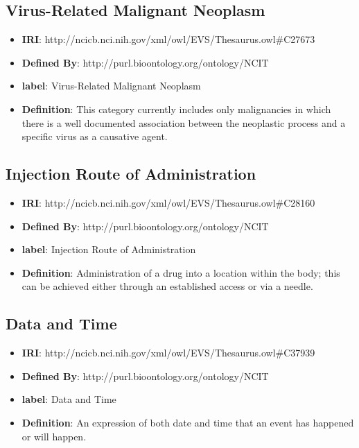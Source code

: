 \documentclass[a4paper,12pt,oneside]{article}
\begin{document}
  
  \subsection{Virus-Related Malignant Neoplasm}

  \begin{itemize}
     \item \textbf{IRI}: http://ncicb.nci.nih.gov/xml/owl/EVS/Thesaurus.owl\#C27673
     \item \textbf{Defined By}: http://purl.bioontology.org/ontology/NCIT
     \item \textbf{label}: Virus-Related Malignant Neoplasm
     \item \textbf{Definition}: This category currently includes only malignancies in which there is a well documented association between the neoplastic process and a specific virus as a causative agent.
  \end{itemize}


  \subsection{Injection Route of Administration}

  \begin{itemize}
     \item \textbf{IRI}: http://ncicb.nci.nih.gov/xml/owl/EVS/Thesaurus.owl\#C28160
     \item \textbf{Defined By}: http://purl.bioontology.org/ontology/NCIT
     \item \textbf{label}: Injection Route of Administration
     \item \textbf{Definition}: Administration of a drug into a location within the body; this can be achieved either through an established access or via a needle.
  \end{itemize}


  \subsection{Data and Time}

  \begin{itemize}
     \item \textbf{IRI}: http://ncicb.nci.nih.gov/xml/owl/EVS/Thesaurus.owl\#C37939
     \item \textbf{Defined By}: http://purl.bioontology.org/ontology/NCIT
     \item \textbf{label}: Data and Time
     \item \textbf{Definition}: An expression of both date and time that an event has happened or will happen.
  \end{itemize}
\end{document}
